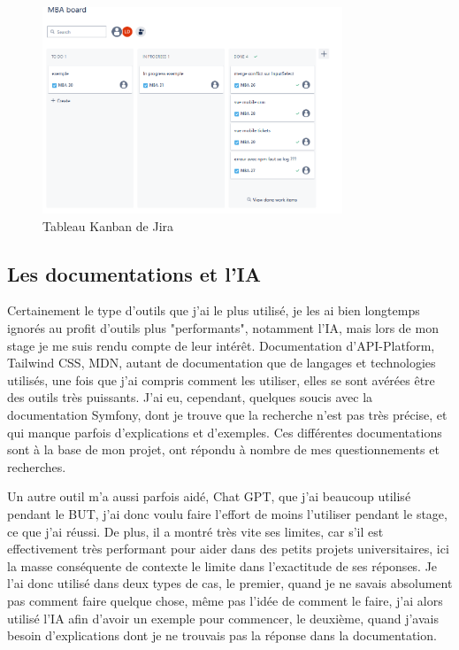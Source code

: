 \documentclass[a4paper,12pt]{report}
\begin{document}
\begin{figure}[h]
    \centering
    \includegraphics[width=0.8\textwidth]{kanban.png}
    \caption{Tableau Kanban de Jira}
    \label{fig:kanban-jira}
\end{figure}

\subsection{Les documentations et l'IA}
Certainement le type d'outils que j'ai le plus utilisé, je les ai bien longtemps ignorés au profit d'outils plus "performants", notamment l'IA, mais lors de mon stage je me suis rendu compte de leur intérêt. Documentation d'API-Platform, Tailwind CSS, MDN, autant de documentation que de langages et technologies utilisés, une fois que j'ai compris comment les utiliser, elles se sont avérées être des outils très puissants. J'ai eu, cependant, quelques soucis avec la documentation Symfony, dont je trouve que la recherche n'est pas très précise, et qui manque parfois d'explications et d'exemples. Ces différentes documentations sont à la base de mon projet, ont répondu à nombre de mes questionnements et recherches.

Un autre outil m'a aussi parfois aidé, Chat GPT, que j'ai beaucoup utilisé pendant le BUT, j'ai donc voulu faire l'effort de moins l'utiliser pendant le stage, ce que j'ai réussi. De plus, il a montré très vite ses limites, car s'il est effectivement très performant pour aider dans des petits projets universitaires, ici la masse conséquente de contexte le limite dans l'exactitude de ses réponses. Je l'ai donc utilisé dans deux types de cas, le premier, quand je ne savais absolument pas comment faire quelque chose, même pas l'idée de comment le faire, j'ai alors utilisé l'IA afin d'avoir un exemple pour commencer, le deuxième, quand j'avais besoin d'explications dont je ne trouvais pas la réponse dans la documentation.
\end{document}
